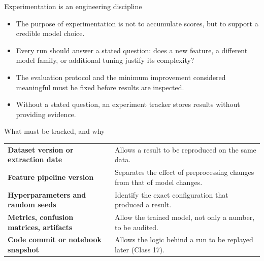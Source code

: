 \begin{frame}{Experimentation is an engineering discipline}
\begin{itemize}
\item The purpose of experimentation is not to accumulate scores, but to support a credible model choice.
\item Every run should answer a stated question: does a new feature, a different model family, or additional tuning justify its complexity?
\item The evaluation protocol and the minimum improvement considered meaningful must be fixed before results are inspected.
\item Without a stated question, an experiment tracker stores results without providing evidence.
\end{itemize}
\coursefooter
\end{frame}

\begin{frame}{What must be tracked, and why}
\begin{tabularx}{\textwidth}{>{\bfseries}l X}
Dataset version or extraction date & Allows a result to be reproduced on the same data. \\
\addlinespace[0.3em]
Feature pipeline version & Separates the effect of preprocessing changes from that of model changes. \\
\addlinespace[0.3em]
Hyperparameters and random seeds & Identify the exact configuration that produced a result. \\
\addlinespace[0.3em]
Metrics, confusion matrices, artifacts & Allow the trained model, not only a number, to be audited. \\
\addlinespace[0.3em]
Code commit or notebook snapshot & Allows the logic behind a run to be replayed later (Class 17). \\
\bottomrule
\end{tabularx}
\coursefooter
\end{frame}

